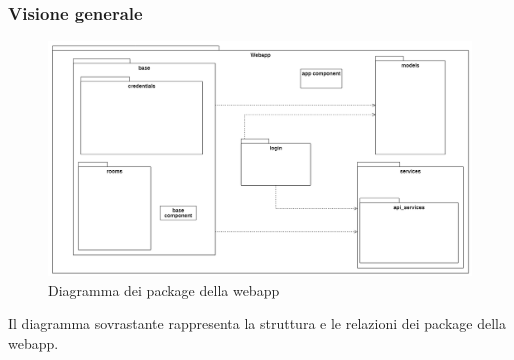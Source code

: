 \subsubsection{Visione generale}
\begin{figure}[H]
	\centering
	\includegraphics[width=18cm]{res/images/webapp-totale-diagrammaPackage.png}
	\caption{Diagramma dei package della webapp}
	\label{fig:DiagrammaPackageWebapp}
\end{figure}
Il diagramma sovrastante rappresenta la struttura e le relazioni dei package della webapp.


